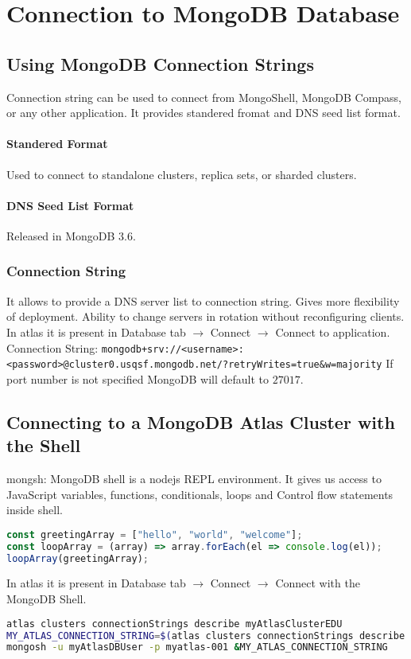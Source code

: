 \documentclass[../main.tex]{subfiles}
\begin{document}
\chapter{Connection to MongoDB Database}
\section{Using MongoDB Connection Strings}
Connection string can be used to connect from MongoShell, MongoDB Compass, or any other application.
It provides standered fromat and DNS seed list format.
\subsubsection{Standered Format}
Used to connect to standalone clusters, replica sets, or sharded clusters.
\subsubsection{DNS Seed List Format}
Released in MongoDB 3.6.
\subsection{Connection String}
It allows to provide a DNS server list to connection string. Gives more flexibility of deployment.
Ability to change servers in rotation without reconfiguring clients.
\newline
In atlas it is present in Database tab $\rightarrow$ Connect $\rightarrow$ Connect to application.
\newline
Connection String: 
\lstinline{mongodb+srv://<username>:<password>@cluster0.usqsf.mongodb.net/?retryWrites=true&w=majority}
If port number is not specified MongoDB will default to $27017$.

\section{Connecting to a MongoDB Atlas Cluster with the Shell}
mongsh: MongoDB shell is a nodejs \gls{REPL} environment.
It gives us access to JavaScript variables, functions, conditionals, loops and Control flow statements inside shell.
\begin{lstlisting}[caption=shell example,language=TypeScript] 
const greetingArray = ["hello", "world", "welcome"]; 
const loopArray = (array) => array.forEach(el => console.log(el));
loopArray(greetingArray);
\end{lstlisting}
In atlas it is present in Database tab $\rightarrow$ Connect $\rightarrow$ Connect with the MongoDB Shell.
\begin{lstlisting}[caption=connect to db,language=bash] 
atlas clusters connectionStrings describe myAtlasClusterEDU
MY_ATLAS_CONNECTION_STRING=$(atlas clusters connectionStrings describe myAtlasClusterEDU | sed "1 d")
mongosh -u myAtlasDBUser -p myatlas-001 &MY_ATLAS_CONNECTION_STRING
\end{lstlisting}
\end{document}
